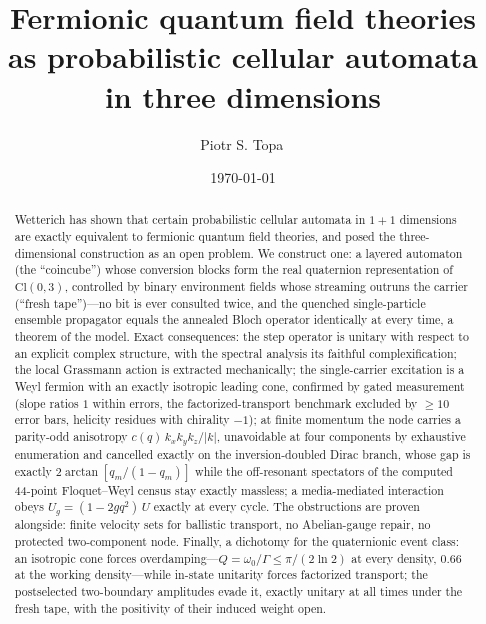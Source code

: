 \documentclass[aps,prd,twocolumn,superscriptaddress,nofootinbib,floatfix]{revtex4-2}
\begin{document}
\title{Fermionic quantum field theories as probabilistic cellular automata
in three dimensions}

\author{Piotr S. Topa\,}

\date{\today}

\begin{abstract}
Wetterich has shown that certain probabilistic cellular automata in
$1+1$ dimensions are exactly equivalent to fermionic quantum field
theories, and posed the three-dimensional construction as an open
problem. We construct one: a layered automaton (the ``coincube'') whose
conversion blocks form the real quaternion representation of
$\mathrm{Cl}(0,3)$, controlled by binary environment fields whose
streaming outruns the carrier (``fresh tape'')---no bit is ever
consulted twice, and the quenched single-particle ensemble propagator
equals the annealed Bloch operator identically at every time, a theorem
of the model. Exact consequences: the step operator is unitary with
respect to an explicit complex structure, with the spectral analysis
its faithful complexification; the local Grassmann action is extracted
mechanically; the single-carrier excitation is a Weyl fermion with an
exactly isotropic leading cone, confirmed by gated measurement (slope
ratios $1$ within errors, the factorized-transport benchmark excluded
by $\ge10$ error bars, helicity residues with chirality $-1$); at
finite momentum the node carries a parity-odd anisotropy
$c(q)\,k_xk_yk_z/|k|$, unavoidable at four components by exhaustive
enumeration and cancelled exactly on the inversion-doubled Dirac
branch, whose gap is exactly $2\arctan[q_m/(1-q_m)]$ while the
off-resonant spectators of the computed 44-point Floquet--Weyl census
stay exactly massless; a media-mediated interaction obeys
$U_g=(1-2gq^2)\,U$ exactly at every cycle. The obstructions are proven
alongside: finite velocity sets for ballistic transport, no
Abelian-gauge repair, no protected two-component node. Finally, a
dichotomy for the quaternionic event class: an isotropic cone forces
overdamping---$Q=\omega_0/\Gamma\le\pi/(2\ln2)$ at every density,
$0.66$ at the working density---while in-state unitarity forces
factorized transport; the postselected two-boundary amplitudes evade
it, exactly unitary at all times under the fresh tape, with the
positivity of their induced weight open.
\end{abstract}

\maketitle
\end{document}
